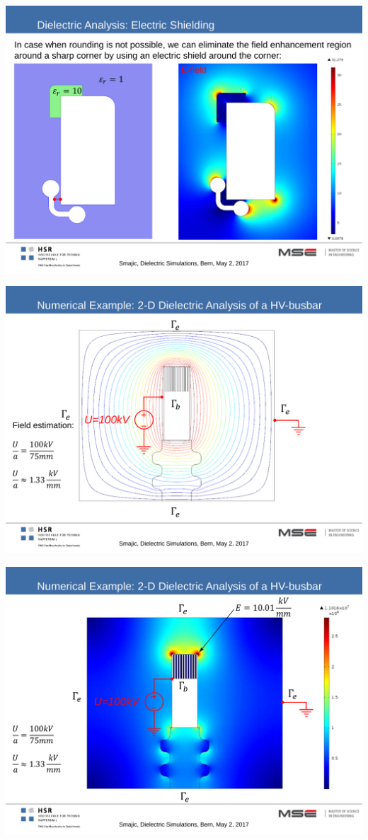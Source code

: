 \\
\begin{minipage}{5cm}
	\includegraphics[width=.8\textwidth]{./images/EFields.pdf}
\end{minipage}
\begin{minipage}{7cm}
	\includegraphics[width=.8\textwidth]{./images/Lines.pdf}
\end{minipage}
\begin{minipage}{7.5cm}
	\includegraphics[width=.8\textwidth]{./images/Field.pdf}
\end{minipage}